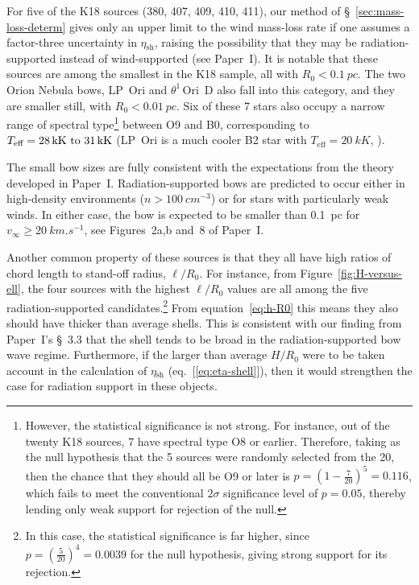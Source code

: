 \documentclass[useAMS, usenatbib, a4paper]{mnras}
\newcommand{\thD}{\(\theta^1\)\,Ori~D}
\newcommand\shell{\ensuremath{_{\text{sh}}}}
\begin{document}
For five of the K18 sources (380, 407, 409, 410, 411), our method of
\S~\ref{sec:mass-loss-determ} gives only an upper limit to the wind
mass-loss rate if one assumes a factor-three uncertainty in
\(\eta\shell\), raising the possibility that they may be
radiation-supported instead of wind-supported (see Paper~I).  It is
notable that these sources are among the smallest in the K18 sample,
all with \(R_0 < \SI{0.1}{pc}\).  The two Orion Nebula bows, LP~Ori
and \thD{} also fall into this category, and they are smaller still,
with \(R_0 < \SI{0.01}{pc}\).  Six of these 7 stars also occupy a
narrow range of spectral type\footnote{%
  However, the statistical significance is not strong.  For
  instance, out of the twenty K18 sources, 7 have spectral type O8 or
  earlier.  Therefore, taking as the null hypothesis that the 5
  sources were randomly selected from the 20, then the chance that
  they should all be O9 or later is
  \(p = (1 - \frac{7}{20})^5 = 0.116\), which fails to meet the
  conventional \(2\sigma\) significance level of \(p = 0.05\),
  thereby lending only weak support for rejection of the null.} %
between O9 and B0, corresponding to
\(T_{\text{eff}} = \text{\SIrange{28}{31}{kK}}\) (LP~Ori is a much
cooler B2 star with \(T_{\text{eff}} = \SI{20}{kK}\),
\citealp{Petit:2008a, Alecian:2013a}).

The small bow sizes are fully consistent with the expectations from
the theory developed in Paper~I.  Radiation-supported bows are predicted
to occur either in high-density environments
(\(n > \SI{100}{cm^{-3}}\)) or for stars with particularly weak winds.
In either case, the bow is expected to be smaller than \SI{0.1}{pc}
for \(v_\infty \ge \SI{20}{km.s^{-1}}\), see Figures~2a,b and~8 of
Paper~I.\@

Another common property of these sources is that they all have high
ratios of chord length to stand-off radius, \(\ell/R_0\).  For
instance, from Figure~\ref{fig:H-versus-ell}, the four sources with
the highest \(\ell/R_0\) values are all among the five
radiation-supported candidates.\footnote{%
  In this case, the statistical significance is far higher, since
  \(p = (\frac{5}{20})^4 = 0.0039\) for the null hypothesis, giving
  strong support for its rejection.}  From equation~\eqref{eq:h-R0}
this means they also should have thicker than average shells.  This is
consistent with our finding from Paper~I's \S~3.3 that the shell tends
to be broad in the radiation-supported bow wave regime.  Furthermore,
if the larger than average \(H/R_0\) were to be taken account in the
calculation of \(\eta\shell\) (eq.~[\ref{eq:eta-shell}]), then it
would strengthen the case for radiation support in these objects.
\end{document}
